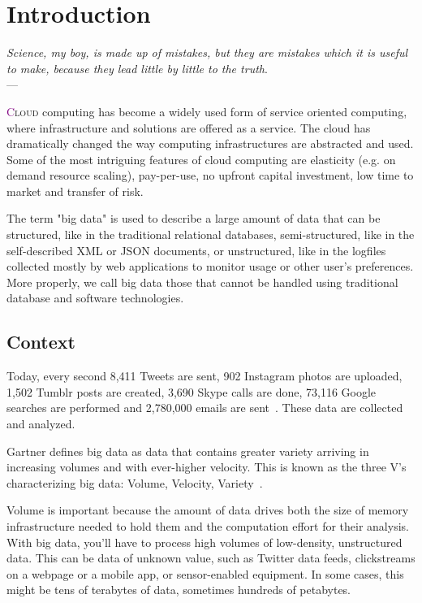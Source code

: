 \chapter{Introduction} \label{chap:Introduction}
\begin{flushright}{\slshape    
   Science, my boy, is made up of mistakes, but they are mistakes
   which it is useful to make, because they lead little by little
   to the truth}. \\ \medskip --- \citeauthor{verne_journey:1957}
    \citeyear{verne_journey:1957}
\end{flushright} 

\lettrine[lines=4]{\textcolor{purple}{C}}{loud} computing has become a widely used form of service oriented computing, where infrastructure and solutions are offered as a service. The cloud has dramatically changed the way computing infrastructures are abstracted and used. Some of the most intriguing features of cloud computing are elasticity (e.g. on demand resource scaling), pay-per-use, no upfront capital investment, low time to market and transfer of risk. 

The term "big data" is used to describe a large amount of data that can be structured, like in the traditional relational databases, semi-structured, like in the self-described XML or JSON documents, or unstructured, like in the logfiles collected mostly by web applications to monitor usage or other user's preferences. More properly, we call big data those that cannot be handled using traditional database and software technologies. 

\section{Context}\label{sec:context}
Today, every second 8,411 Tweets are sent, 902 Instagram photos are uploaded, 1,502 Tumblr posts are created, 3,690 Skype calls are done, 73,116 Google searches are performed and 2,780,000 emails are sent~\cite{misc:InternetLiveStats}. These data are collected and analyzed. 

Gartner defines big data as data that contains greater variety arriving in increasing volumes and with ever-higher velocity. This is known as the three V's characterizing  big data: Volume, Velocity, Variety~\cite{WhatIsBigData}. 

Volume is important because the amount of data drives both the size of memory infrastructure needed to hold them and the computation effort for their analysis. With big data, you’ll have to process high volumes of low-density, unstructured data. This can be data of unknown value, such as Twitter data feeds, clickstreams on a webpage or a mobile app, or sensor-enabled equipment. In some cases, this might be tens of terabytes of data, sometimes hundreds of petabytes. 

